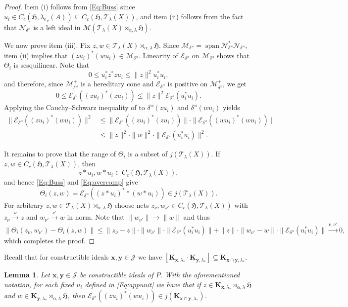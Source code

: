 \documentclass[11pt,final]{amsart}
\numberwithin{equation}{section}
\theoremstyle{plain}
\newtheorem{lemma}[theorem]{Lemma}
\theoremstyle{definition}
\theoremstyle{remark}
\newcommand{\E}{{\mathcal{E}}}
\newcommand{\J}{{\mathcal{J}}}
\newcommand{\M}{{\mathcal{M}}}
\newcommand{\N}{{\mathcal{N}}}
\newcommand{\T}{{\mathcal{T}}}
\def\al{\alpha}
\def\de{\delta}
\def\la{\lambda}
\newcommand{\fH}{{\mathfrak{H}}}
\newcommand{\spn}{\operatorname{span}}
\newcommand{\bo}[1]{\mathbf{#1}} %
\begin{document}
\begin{proof}
Item (i) follows from \eqref{Eq:Buss} since $u_i \in C_c(\fH,\la_{e_P}(A)) \subseteq C_c(\fH,\T_\la(X))$,
and item (ii) follows from the fact that 
$\N_{\de^{\rtimes}}$ is a left ideal in $\M(\T_\la(X)\rtimes_{\al,\la}\fH)$.

We now prove item (iii). 
Fix $z,w\in\T_\la(X)\rtimes_{\al,\la}\fH$. Since
$\M_{\de^{\rtimes}}=\spn\N_{\de^{\rtimes}}^*\N_{\de^{\rtimes}}$, item (ii) implies that $(z u_i)^*(w u_i)\in\M_{\de^{\rtimes}}$. Linearity of $\E_{\de^{\rtimes}}$ on $\M_{\de^{\rtimes}}$ shows that $\Theta_i$ is
sesquilinear.
Note that 
\[
0\leq u_i^* z^* z u_i
\leq \|z\|^2 u_i^* u_i,
\]
and therefore, since $\M_{\de^{\rtimes}}^+$ is a hereditary cone and $\E_{\de^{\rtimes}}$ is positive on $\M_{\de^\rtimes}^+$, we get
\[
0\leq
\E_{\de^{\rtimes}}((zu_i)^*(zu_i))
\leq
\|z\|^2 \E_{\de^\rtimes}(u_i^*u_i).
\]
Applying the Cauchy--Schwarz inequality of
\cite[Proposition~3.15]{KV99} to
\(\de^{\rtimes}(zu_i)\) and \(\de^{\rtimes}(wu_i)\) yields
\[
\begin{aligned}
\|\E_{\de^{\rtimes}}((zu_i)^*(wu_i))\|^2
&\leq
\|\E_{\de^{\rtimes}}((zu_i)^*(zu_i))\|\cdot
\|\E_{\de^{\rtimes}}((wu_i)^*(wu_i))\|\\
&\leq
\|z\|^2 \cdot \|w\|^2 \cdot \|\E_{\de^\rtimes}(u_i^*u_i)\|^2.
\end{aligned}
\]

It remains to prove that the range of $\Theta_i$ is a subset of $j(\T_\la(X))$. If
$z,w\in C_c(\fH,\T_\la(X))$, then 
\[
z \ast u_i,w \ast u_i\in C_c(\fH,\T_\la(X)),
\]
and hence \eqref{Eq:Buss} and \eqref{Eq:avercomp} give
\[
\Theta_i(z,w)
=
\E_{\de^{\rtimes}}((z \ast u_i)^* \ast (w \ast u_i))
\in j(\T_\la(X)).
\]
For arbitrary $z,w\in\T_\la(X)\rtimes_{\al,\la}\fH$ choose nets
$z_\nu,w_{\nu'}\in C_c(\fH,\T_\la(X))$ with $z_\nu \xrightarrow{\nu}z$ and $w_{\nu'} \xrightarrow{\nu'} w$ in norm. Note that $\|w_{\nu'}\| \to \|w\|$ and thus
\[
\|\Theta_i(z_\nu,w_{\nu'})-\Theta_i(z,w)\|
\leq
\|z_\nu-z\|\cdot \|w_{\nu'}\|\cdot \|\E_{\de^\rtimes}(u_i^*u_i)\|
+\|z\|\cdot \|w_{\nu'}-w\|\cdot \|\E_{\de^\rtimes}(u_i^*u_i)\| \xrightarrow{\nu,\nu'} 0,
\]
which completes the proof.
\end{proof}

Recall that for constructible ideals $\bo{x}, \bo{y}\in \J$ we have $[\bo{K}_{\bo{x},\la_\ast} \cdot \bo{K}_{\bo{y},\la_\ast}]\subseteq \bo{K}_{\bo{x}\cap \bo{y},\la_\ast}$.

\begin{lemma}\label{L:invar}
Let $\bo{x}, \bo{y} \in \J$ be constructible ideals of $P$. With the aforementioned notation, for each fixed $u_i$ defined in \eqref{Eq:appunit} we have that if $z\in \bo{K}_{\bo{x},\la_\ast}\rtimes_{\al,\la}\fH$ and
$w\in \bo{K}_{\bo{y},\la_\ast}\rtimes_{\al,\la}\fH$, then
$\E_{\de^{\rtimes}}((z u_i)^*(w u_i))\in j(\bo{K}_{\bo{x}\cap \bo{y},\la_\ast})$.
\end{lemma}
\end{document}
